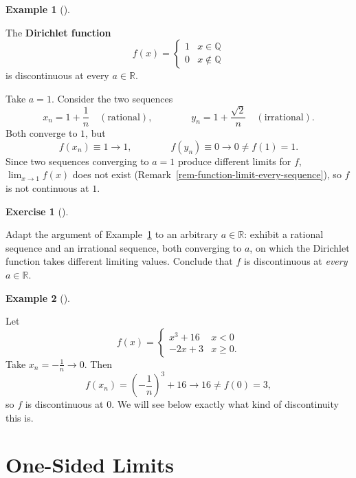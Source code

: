 \documentclass[
  letterpaper,
  DIV=11,
  numbers=noendperiod]{scrreprt}
\theoremstyle{plain}
\theoremstyle{plain}
\theoremstyle{definition}
\theoremstyle{definition}
\newtheorem{exercise}{Exercise}[chapter]
\theoremstyle{definition}
\newtheorem{example}{Example}[chapter]
\theoremstyle{plain}
\theoremstyle{plain}
\theoremstyle{remark}
\begin{document}
\begin{example}[]\protect\hypertarget{exm-dirichlet-discontinuous}{}\label{exm-dirichlet-discontinuous}

\hfill\break
The \textbf{Dirichlet function} \[
f(x) = \begin{cases} 1 & x\in\mathbb{Q}\\ 0 & x\notin\mathbb{Q}\end{cases}
\] is discontinuous at every \(a\in\mathbb{R}\).

Take \(a=1\). Consider the two sequences \[
x_n = 1+\frac1n \quad(\text{rational}), \qquad\qquad y_n = 1+\frac{\sqrt2}{n} \quad(\text{irrational}).
\] Both converge to \(1\), but \[
f(x_n) \equiv 1 \to 1, \qquad\qquad f(y_n) \equiv 0 \to 0 \neq f(1) = 1.
\] Since two sequences converging to \(a=1\) produce different limits
for \(f\), \(\lim_{x\to1}f(x)\) does not exist
(Remark~\ref{rem-function-limit-every-sequence}), so \(f\) is not
continuous at \(1\).

\end{example}

\begin{exercise}[]\protect\hypertarget{exr-dirichlet-general-a}{}\label{exr-dirichlet-general-a}

Adapt the argument of Example~\ref{exm-dirichlet-discontinuous} to an
arbitrary \(a\in\mathbb{R}\): exhibit a rational sequence and an
irrational sequence, both converging to \(a\), on which the Dirichlet
function takes different limiting values. Conclude that \(f\) is
discontinuous at \emph{every} \(a\in\mathbb{R}\).

\end{exercise}

\begin{example}[]\protect\hypertarget{exm-piecewise-jump}{}\label{exm-piecewise-jump}

\hfill\break
Let \[
f(x) = \begin{cases} x^3+16 & x<0 \\ -2x+3 & x\ge 0. \end{cases}
\] Take \(x_n = -\tfrac1n \to 0\). Then \[
f(x_n) = \left(-\frac1n\right)^{\!3} + 16 \longrightarrow 16 \neq f(0) = 3,
\] so \(f\) is discontinuous at \(0\). We will see below exactly what
kind of discontinuity this is.

\end{example}

\section{One-Sided Limits}\label{one-sided-limits}
\end{document}
